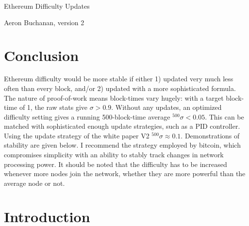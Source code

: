 \documentclass[10pt,a4paper]{article}
\begin{document}
\begin{center}
{\huge Ethereum Difficulty Updates}

{\small Aeron Buchanan, version 2}
\end{center} 

\section*{Conclusion}
Ethereum difficulty would be more stable if either 1) updated very much less often than every block, and/or 2) updated with a more sophisticated formula. The nature of proof-of-work means block-times vary hugely: with a target block-time of 1, the raw stats give $\sigma>0.9$. Without any updates, an optimized difficulty setting gives a running 500-block-time average $^{500}\sigma<0.05$. This can be matched with sophisticated enough update strategies, such as a PID controller. Using the update strategy of the white paper V2 $^{500}\sigma\approx0.1$. Demonstrations of stability are given below. I recommend the strategy employed by bitcoin, which compromises simplicity with an ability to stably track changes in network processing power. It should be noted that the difficulty has to be increased whenever more nodes join the network, whether they are more powerful than the average node or not.

\section*{Introduction}
\end{document}
